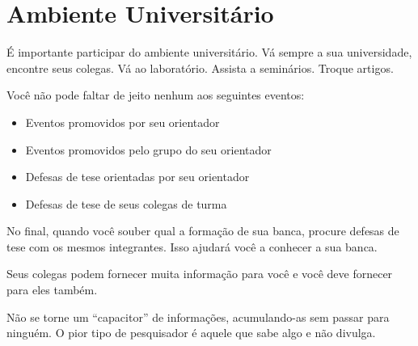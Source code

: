 \chapter{Ambiente Universitário}

É importante participar do ambiente universitário. Vá sempre a sua universidade, encontre seus colegas. Vá ao laboratório. Assista a seminários. Troque artigos.


Você não pode faltar de jeito nenhum aos seguintes eventos:
\begin{itemize}
    \item 	Eventos promovidos por seu orientador
    \item 	Eventos promovidos pelo grupo do seu orientador
    \item 	Defesas de tese orientadas por seu orientador
    \item 	Defesas de tese de seus colegas de turma
\end{itemize}

No final, quando você souber qual a formação de sua banca, procure defesas de tese com os mesmos integrantes. Isso ajudará você a conhecer a sua banca.

Seus colegas podem fornecer muita informação para você e você deve fornecer para eles também.

Não se torne um “capacitor” de informações, acumulando-as sem passar para ninguém. O pior tipo de pesquisador é aquele que sabe algo e não divulga.
